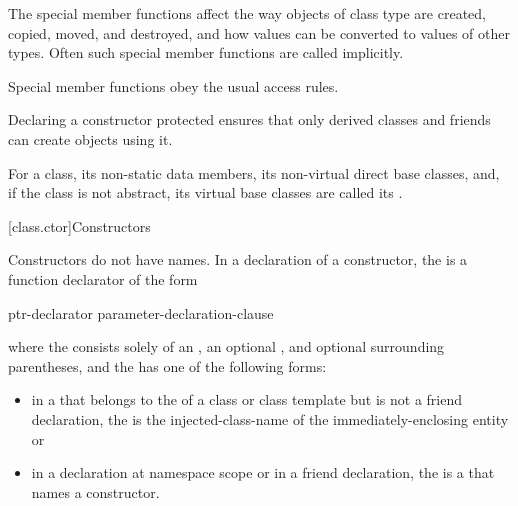 \pnum
\begin{note}
The special member functions affect the way objects of class type are created,
copied, moved, and destroyed, and how values can be converted to values of other types.
Often such special member functions are called implicitly.
\end{note}

\pnum
{}%
Special member functions obey the usual access rules.
\begin{example}
Declaring a constructor protected
ensures that only derived classes and friends can create objects using it.
\end{example}

\pnum
For a class, its non-static data members, its non-virtual direct base classes,
and, if the class is not abstract, its virtual base
classes are called its .

[class.ctor]{Constructors}%
%
%

\pnum
Constructors do not have names.
In a declaration of a constructor, the  is a
function declarator of the form

\begin{ncbnf}
ptr-declarator \terminal{(} parameter-declaration-clause \terminal{)}  
\end{ncbnf}

where the  consists solely of an
, an optional ,
and optional surrounding parentheses, and the  has
one of the following forms:

\begin{itemize}
\item
in a  that belongs to the
 of a class or class template
but is not a friend
declaration, the  is the
injected-class-name of the immediately-enclosing entity or

\item
in a declaration at namespace scope or in a friend declaration, the
 is a  that names a
constructor.
\end{itemize}

